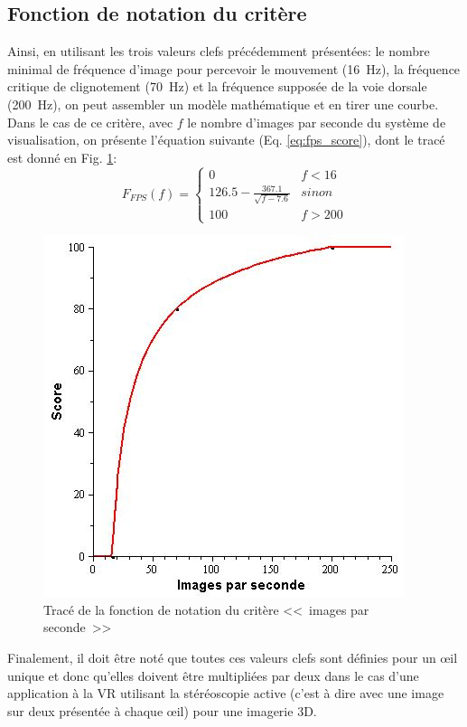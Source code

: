 	\subsection{Fonction de notation du critère}
	\par Ainsi, en utilisant les trois valeurs clefs précédemment présentées: le nombre minimal de fréquence d'image pour percevoir le mouvement (16~Hz), la fréquence critique de clignotement (70~Hz) et la fréquence supposée de la voie dorsale (200~Hz), on peut assembler un modèle mathématique et en tirer une courbe. Dans le cas de ce critère, avec $f$ le nombre d'images par seconde du système de visualisation, on présente l'équation suivante (Eq. \ref{eq:fps_score}), dont le tracé est donné en Fig. \ref{fig:score_fps}:
	\begin{equation}
		F_{FPS}(f) = \begin{cases}
		0 & f < 16\\
		126.5 - \frac{367.1}{\sqrt{f - 7.6}} & sinon\\
		100 & f > 200
		\end{cases}
		\label{eq:fps_score}
	\end{equation}

	\begin{figure}[h]
		\centering
		\includegraphics[scale=.75]{Figures/FPS}
		\caption{Tracé de la fonction de notation du critère <<~images par seconde~>>}
		\label{fig:score_fps}
	\end{figure}

	\par Finalement, il doit être noté que toutes ces valeurs clefs sont définies pour un œil unique et donc qu'elles doivent être multipliées par deux dans le cas d'une application à la VR utilisant la stéréoscopie active (c'est à dire avec une image sur deux présentée à chaque œil) pour une imagerie 3D. %
	
